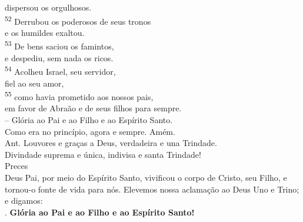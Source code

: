 \documentclass{book}
\begin{document}
\begin{center}
    dispersou os orgulhosos. \\
    \textsuperscript{\underline{\hspace{.07in}}\textcolor{VioletRed2}{52}} Derrubou os poderosos de seus tronos \textsuperscript{\gresixstar{}} \\
    e os humildes exaltou.
    \vspace{.2cm} \\
    \textsuperscript{\underline{\hspace{.07in}}\textcolor{VioletRed2}{53}} De bens saciou os famintos, \textsuperscript{\gresixstar{}}\\
    e despediu, sem nada os ricos. \\
    \textsuperscript{\underline{\hspace{.07in}}\textcolor{VioletRed2}{54}} Acolheu Israel, seu servidor, \textsuperscript{\gresixstar{}} \\
    fiel ao seu amor,
    \vspace{.2cm} \\
    \textsuperscript{\underline{\hspace{.07in}}\textcolor{VioletRed2}{55}} como havia prometido aos nossos pais, \textsuperscript{\gresixstar{}} \\
    em favor de Abraão e de seus filhos para sempre.
    \vspace{.2cm} \\
    -- Glória ao Pai e ao Filho e ao Espírito Santo.\ \textsuperscript{\gresixstar{}} \\
    Como era no princípio, agora e sempre. Amém.
    \vspace{.2cm} \\
    \textcolor{VioletRed2}{Ant.} Louvores e graças a Deus, verdadeira e una Trindade. \\
    Divindade suprema e única, indivisa e santa Trindade!
    \vspace{.2cm} \\
    \textcolor{VioletRed2}{Preces}
    \vspace{.2cm} \\
    Deus Pai, por meio do Espírito Santo, vivificou o corpo de Cristo, seu Filho, e tornou-o fonte de vida para nós. Elevemos nossa aclamação ao Deus Uno e Trino; e digamos:
    \vspace{.2cm} \\
    {\color{VioletRed2} \Rbar.} \textbf{Glória ao Pai e ao Filho e ao Espírito Santo!}
    \vspace{.2cm} \\

\end{center}
\end{document}
